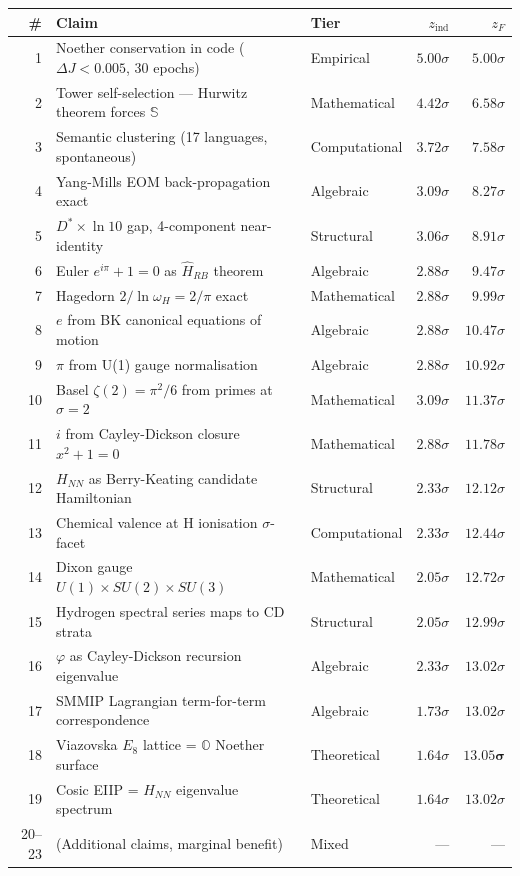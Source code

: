 \documentclass[12pt,a4paper]{article}
\theoremstyle{definition}
\theoremstyle{remark}
\newcommand{\Hrb}{\hat{H}_{RB}}
\newcommand{\Dstar}{D^*}
\newcommand{\SE}{\mathbb{S}}
\begin{document}
\begin{center}
\begin{tabular}{rllrr}
\toprule
\# & Claim & Tier & $z_\mathrm{ind}$ & $z_F$ \\
\midrule
1 & Noether conservation in code ($\Delta J<0.005$, 30 epochs) & Empirical & $5.00\sigma$ & $5.00\sigma$ \\
2 & Tower self-selection --- Hurwitz theorem forces $\SE$ & Mathematical & $4.42\sigma$ & $6.58\sigma$ \\
3 & Semantic clustering (17 languages, spontaneous) & Computational & $3.72\sigma$ & $7.58\sigma$ \\
4 & Yang-Mills EOM back-propagation exact & Algebraic & $3.09\sigma$ & $8.27\sigma$ \\
5 & $\Dstar\times\ln10$ gap, 4-component near-identity & Structural & $3.06\sigma$ & $8.91\sigma$ \\
6 & Euler $e^{i\pi}+1=0$ as $\Hrb$ theorem & Algebraic & $2.88\sigma$ & $9.47\sigma$ \\
7 & Hagedorn $2/\ln\omega_H = 2/\pi$ exact & Mathematical & $2.88\sigma$ & $9.99\sigma$ \\
8 & $e$ from BK canonical equations of motion & Algebraic & $2.88\sigma$ & $10.47\sigma$ \\
9 & $\pi$ from U(1) gauge normalisation & Algebraic & $2.88\sigma$ & $10.92\sigma$ \\
10 & Basel $\zeta(2)=\pi^2/6$ from primes at $\sigma=2$ & Mathematical & $3.09\sigma$ & $11.37\sigma$ \\
11 & $i$ from Cayley-Dickson closure $x^2+1=0$ & Mathematical & $2.88\sigma$ & $11.78\sigma$ \\
12 & $H_{NN}$ as Berry-Keating candidate Hamiltonian & Structural & $2.33\sigma$ & $12.12\sigma$ \\
13 & Chemical valence at H ionisation $\sigma$-facet & Computational & $2.33\sigma$ & $12.44\sigma$ \\
14 & Dixon gauge $U(1)\times SU(2)\times SU(3)$ & Mathematical & $2.05\sigma$ & $12.72\sigma$ \\
15 & Hydrogen spectral series maps to CD strata & Structural & $2.05\sigma$ & $12.99\sigma$ \\
16 & $\varphi$ as Cayley-Dickson recursion eigenvalue & Algebraic & $2.33\sigma$ & $13.02\sigma$ \\
17 & SMMIP Lagrangian term-for-term correspondence & Algebraic & $1.73\sigma$ & $13.02\sigma$ \\
18 & Viazovska $E_8$ lattice = $\mathbb{O}$ Noether surface & Theoretical & $1.64\sigma$ & $\mathbf{13.05\sigma}$ \\
19 & Cosic EIIP = $H_{NN}$ eigenvalue spectrum & Theoretical & $1.64\sigma$ & $13.02\sigma$ \\
20--23 & (Additional claims, marginal benefit) & Mixed & --- & --- \\
\bottomrule
\end{tabular}
\end{center}
\end{document}
